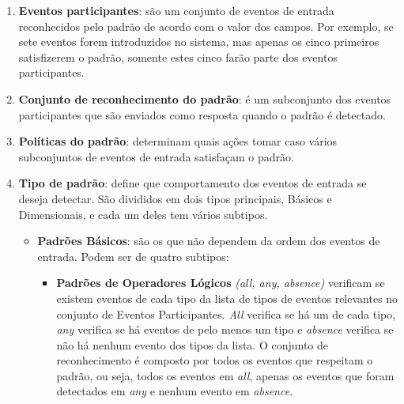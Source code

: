 \begin{itemize}
\begin{enumerate}
\item \textbf{Eventos participantes}: são um conjunto de eventos de entrada reconhecidos pelo padrão de acordo com o valor dos campos. Por exemplo, se sete eventos forem introduzidos no sistema, mas apenas os cinco primeiros satisfizerem o padrão, somente estes cinco farão parte dos eventos participantes. 
\item \textbf{Conjunto de reconhecimento do padrão}: é um subconjunto dos eventos participantes que são enviados como resposta quando o padrão é detectado. 
\item \textbf{Políticas do padrão}: determinam quais ações tomar caso vários subconjuntos de eventos de entrada satisfaçam o padrão. 
\item \textbf{Tipo de padrão}: define que comportamento dos eventos de entrada se deseja detectar. São divididos em dois tipos principais, Básicos e Dimensionais, e cada um deles tem vários subtipos. 
\begin{itemize}
\item \textbf{Padrões Básicos}: são os que não dependem da ordem dos eventos de entrada. Podem ser de quatro subtipos:
\begin{itemize}
\item \textbf{Padrões de Operadores Lógicos} \emph{(all, any, absence)} verificam se existem eventos de cada tipo da lista de tipos de eventos relevantes no conjunto de Eventos Participantes. \emph{All} verifica se há um de cada tipo, \emph{any} verifica se há eventos de pelo menos um tipo e \emph{absence} verifica se não há nenhum evento dos tipos da lista. O conjunto de reconhecimento é composto por todos os eventos que respeitam o padrão, ou seja, todos os eventos em \emph{all}, apenas os eventos que foram detectados em \emph{any} e nenhum evento em \emph{absence}.

\end{itemize}
\end{itemize}
\end{enumerate}
\end{itemize}
